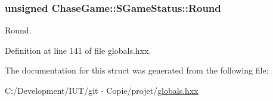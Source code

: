 \hypertarget{struct_chase_game_1_1_s_game_status_afd8742d8a27af58077d4a9fe9f9b1c4f}{
\subsubsection[{Round}]{\setlength{\rightskip}{0pt plus 5cm}unsigned Chase\-Game\-::\-S\-Game\-Status\-::\-Round}}\label{struct_chase_game_1_1_s_game_status_afd8742d8a27af58077d4a9fe9f9b1c4f}


Round. 



Definition at line 141 of file globals.\-hxx.



The documentation for this struct was generated from the following file\-:\begin{DoxyCompactItemize}
\item 
C\-:/\-Development/\-I\-U\-T/git -\/ Copie/projet/\hyperlink{globals_8hxx}{globals.\-hxx}\end{DoxyCompactItemize}
